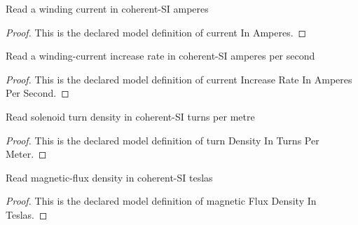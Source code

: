 \begin{definition}
  \label{def:physics:phyx-mini-0938:phyxminiproblems-problemphyxmini0938-currentinamperes}
  Read a winding current in coherent-SI amperes
\end{definition}
\begin{proof}
  This is the declared model definition of current In Amperes.
\end{proof}
\begin{definition}
  \label{def:physics:phyx-mini-0938:phyxminiproblems-problemphyxmini0938-currentincreaserateinamperespersecond}
  Read a winding-current increase rate in coherent-SI amperes per second
\end{definition}
\begin{proof}
  This is the declared model definition of current Increase Rate In Amperes Per Second.
\end{proof}
\begin{definition}
  \label{def:physics:phyx-mini-0938:phyxminiproblems-problemphyxmini0938-turndensityinturnspermeter}
  Read solenoid turn density in coherent-SI turns per metre
\end{definition}
\begin{proof}
  This is the declared model definition of turn Density In Turns Per Meter.
\end{proof}
\begin{definition}
  \label{def:physics:phyx-mini-0938:phyxminiproblems-problemphyxmini0938-magneticfluxdensityinteslas}
  Read magnetic-flux density in coherent-SI teslas
\end{definition}
\begin{proof}
  This is the declared model definition of magnetic Flux Density In Teslas.
\end{proof}

